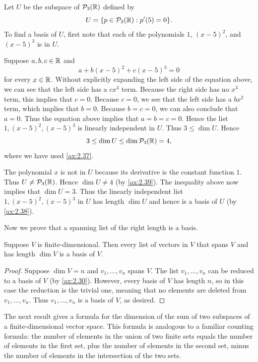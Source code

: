 \begin{example}\label{ax:2.41}
Let $U$ be the subspace of $\mathcal{P}_3(\mathbb{R})$ defined by
\[ U = \{p\in\mathcal{P}_3(\mathbb{R}) : p'(5)=0\}. \]
To find a basis of $U$, first note that each of the polynomials $1$, $(x-5)^2$,
and $(x-5)^3$ is in $U$.

Suppose $a,b,c\in\mathbb{R}$ and
\[ a+b(x-5)^2+c(x-5)^3 = 0 \]
for every $x\in\mathbb{R}$. Without explicitly expanding the left side of the equation
above, we can see that the left side has a $cx^3$ term. Because the right side
has no $x^3$ term, this implies that $c=0$. Because $c=0$, we see that the left
side has a $bx^2$ term, which implies that $b=0$. Because $b=c=0$, we can also
conclude that $a=0$. Thus the equation above implies that $a=b=c=0$. Hence the
list $1,(x-5)^2,(x-5)^3$ is linearly independent in $U$. Thus $3\le\dim U$.
Hence
\[ 3 \le \operatorname{dim} U \le \operatorname{dim}\mathcal{P}_3(\mathbb{R}) = 4, \]
where we have used \ref{ax:2.37}.

The polynomial $x$ is not in $U$ because its derivative is the constant
function $1$. Thus $U\ne\mathcal{P}_3(\mathbb{R})$. Hence $\dim U\ne4$ (by \ref{ax:2.39}). The
inequality above now implies that $\dim U=3$. Thus the linearly independent list
$1,(x-5)^2,(x-5)^3$ in $U$ has length $\dim U$ and hence is a basis of $U$
(by \ref{ax:2.38}).
\end{example}

Now we prove that a spanning list of the right length is a basis.

\begin{result}\label{ax:2.42}
Suppose $V$ is finite-dimensional. Then every list of vectors in $V$ that spans
$V$ and has length $\dim V$ is a basis of $V$.
\end{result}

\begin{proof}
Suppose $\dim V=n$ and $v_1,\dots,v_n$ spans $V$. The list $v_1,\dots,v_n$ can
be reduced to a basis of $V$ (by \ref{ax:2.30}). However, every basis of $V$ has
length $n$, so in this case the reduction is the trivial one, meaning that no
elements are deleted from $v_1,\dots,v_n$. Thus $v_1,\dots,v_n$ is a basis of
$V$, as desired.
\end{proof}

The next result gives a formula for the dimension of the sum of two subspaces
of a finite-dimensional vector space. This formula is analogous to a familiar
counting formula: the number of elements in the union of two finite sets equals
the number of elements in the first set, plus the number of elements in the
second set, minus the number of elements in the intersection of the two sets.

